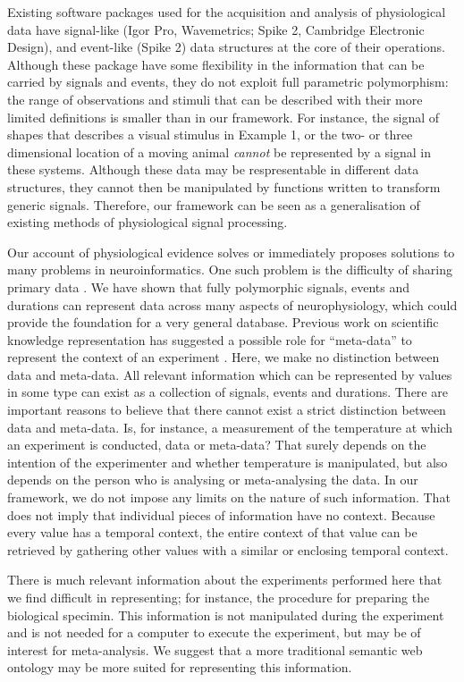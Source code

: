 Existing software packages used for the acquisition and analysis of
physiological data have signal-like (Igor Pro, Wavemetrics; Spike 2,
Cambridge Electronic Design), and event-like (Spike 2) data structures
at the core of their operations. Although these package have some
flexibility in the information that can be carried by signals and
events, they do not exploit full parametric polymorphism: the range of
observations and stimuli that can be described with their more limited
definitions is smaller than in our framework. For instance, the signal
of shapes that describes a visual stimulus in Example 1, or the two-
or three dimensional location of a moving animal \emph{cannot} be
represented by a signal in these systems. Although these data may be
respresentable in different data structures, they cannot then be
manipulated by functions written to transform generic
signals. Therefore, our framework can be seen as a generalisation of
existing methods of physiological signal processing.

Our account of physiological evidence solves or immediately proposes
solutions to many problems in neuroinformatics. One such problem is
the difficulty of sharing primary data \citep{Amari2002}. We have
shown that fully polymorphic signals, events and durations can
represent data across many aspects of neurophysiology, which could
provide the foundation for a very general database. Previous work on
scientific knowledge representation has suggested a possible role for
``meta-data'' to represent the context of an experiment
\citep{Bower2009}. Here, we make no distinction between data and
meta-data. All relevant information which can be represented by values
in some type can exist as a collection of signals, events and
durations. There are important reasons to believe that there cannot
exist a strict distinction between data and meta-data. Is, for
instance, a measurement of the temperature at which an experiment is
conducted, data or meta-data?  That surely depends on the intention of
the experimenter and whether temperature is manipulated, but also
depends on the person who is analysing or meta-analysing the data. In
our framework, we do not impose any limits on the nature of such
information. That does not imply that individual pieces of information
have no context. Because every value has a temporal context, the
entire context of that value can be retrieved by gathering other
values with a similar or enclosing temporal context.

There is much relevant information about the experiments performed
here that we find difficult in representing; for instance, the
procedure for preparing the biological specimin. This information is
not manipulated during the experiment and is not needed for a computer
to execute the experiment, but may be of interest for
meta-analysis. We suggest that a more traditional semantic web
ontology may be more suited for representing this information.

